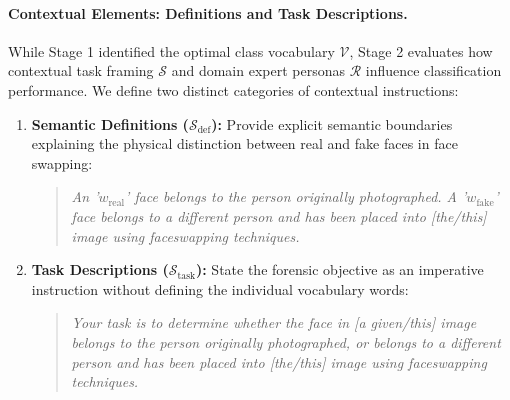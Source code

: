 \paragraph{Contextual Elements: Definitions and Task Descriptions.}
While Stage 1 identified the optimal class vocabulary $\mathcal{V}$, Stage 2 evaluates how contextual task framing $\mathcal{S}$ and domain expert personas $\mathcal{R}$ influence classification performance. We define two distinct categories of contextual instructions:
\begin{enumerate}
    \item \textbf{Semantic Definitions ($\mathcal{S}_{\text{def}}$):} Provide explicit semantic boundaries explaining the physical distinction between real and fake faces in face swapping:
    \begin{quote}
        \emph{An '$w_{\text{real}}$' face belongs to the person originally photographed. A '$w_{\text{fake}}$' face belongs to a different person and has been placed into [the/this] image using faceswapping techniques.}
    \end{quote}
    \item \textbf{Task Descriptions ($\mathcal{S}_{\text{task}}$):} State the forensic objective as an imperative instruction without defining the individual vocabulary words:
    \begin{quote}
        \emph{Your task is to determine whether the face in [a given/this] image belongs to the person originally photographed, or belongs to a different person and has been placed into [the/this] image using faceswapping techniques.}
    \end{quote}
\end{enumerate}

